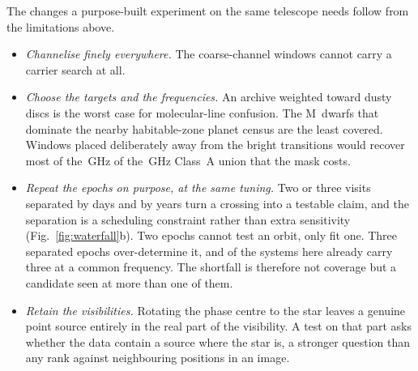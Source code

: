 The changes a purpose-built experiment on the same telescope needs follow from
the limitations above.

\begin{itemize}[leftmargin=1.2em,itemsep=2pt,topsep=3pt,parsep=0pt]
\item \emph{Channelise finely everywhere.} The \NCoarse{} coarse-channel
windows cannot carry a carrier search at all.
\item \emph{Choose the targets and the frequencies.} An archive weighted
toward dusty discs is the worst case for molecular-line confusion. The
M~dwarfs that dominate the nearby habitable-zone planet census are the least
covered. Windows placed deliberately away from the bright transitions
would recover most of the \MkMaskAGHz\,GHz of the \CvUnionA\,GHz Class~A
union that the mask costs.
\item \emph{Repeat the epochs on purpose, at the same tuning.} Two or three
visits separated by days and by years turn a crossing into a testable claim,
and the separation is a scheduling constraint rather than extra sensitivity
(Fig.~\ref{fig:waterfall}b). Two epochs cannot test an orbit, only fit one.
Three separated epochs over-determine it, and \PaNSysThree{} of the
\NSysClassA{} systems here already carry three at a common frequency. The
shortfall is therefore not coverage but a candidate seen at more than one of them.
\item \emph{Retain the visibilities.} Rotating the phase centre to the star
leaves a genuine point source entirely in the real part of the visibility.
A test on that part asks whether the data contain a source where the star is, a stronger
question than any rank against neighbouring positions in an image.
\end{itemize}
